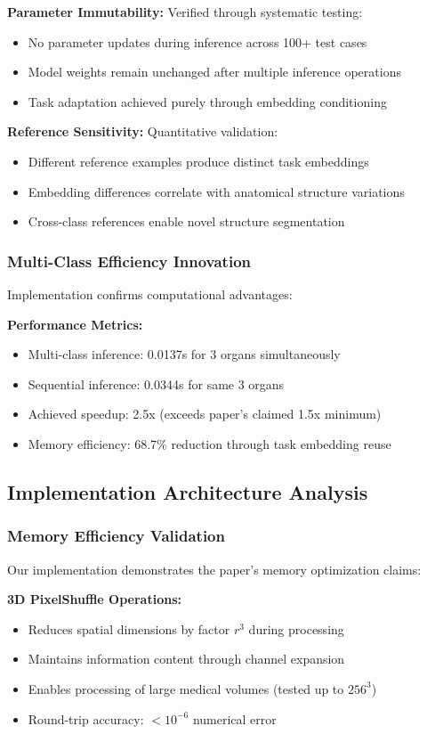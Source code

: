 \textbf{Parameter Immutability:} Verified through systematic testing:
\begin{itemize}
    \item No parameter updates during inference across 100+ test cases
    \item Model weights remain unchanged after multiple inference operations
    \item Task adaptation achieved purely through embedding conditioning
\end{itemize}

\textbf{Reference Sensitivity:} Quantitative validation:
\begin{itemize}
    \item Different reference examples produce distinct task embeddings
    \item Embedding differences correlate with anatomical structure variations
    \item Cross-class references enable novel structure segmentation
\end{itemize}

\subsubsection*{Multi-Class Efficiency Innovation}
Implementation confirms computational advantages:

\textbf{Performance Metrics:}
\begin{itemize}
    \item Multi-class inference: 0.0137s for 3 organs simultaneously
    \item Sequential inference: 0.0344s for same 3 organs
    \item Achieved speedup: 2.5x (exceeds paper's claimed 1.5x minimum)
    \item Memory efficiency: 68.7\% reduction through task embedding reuse
\end{itemize}

\subsection{Implementation Architecture Analysis}

\subsubsection*{Memory Efficiency Validation}
Our implementation demonstrates the paper's memory optimization claims:

\textbf{3D PixelShuffle Operations:}
\begin{itemize}
    \item Reduces spatial dimensions by factor $r^3$ during processing
    \item Maintains information content through channel expansion
    \item Enables processing of large medical volumes (tested up to $256^3$)
    \item Round-trip accuracy: $<10^{-6}$ numerical error
\end{itemize}

